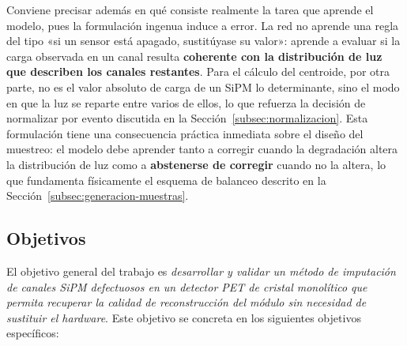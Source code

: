 Conviene precisar además en qué consiste realmente la tarea que aprende el modelo, pues la
formulación ingenua induce a error. La red no aprende una regla del tipo «si un sensor está apagado,
sustitúyase su valor»: aprende a evaluar si la carga observada en un canal resulta
\textbf{coherente con la distribución de luz que describen los canales restantes}. Para el cálculo
del centroide, por otra parte, no es el valor absoluto de carga de un SiPM lo determinante, sino el
modo en que la luz se reparte entre varios de ellos, lo que refuerza la decisión de normalizar por
evento discutida en la Sección~\ref{subsec:normalizacion}. Esta formulación tiene una consecuencia
práctica inmediata sobre el diseño del muestreo: el modelo debe aprender tanto a corregir cuando la
degradación altera la distribución de luz como a \textbf{abstenerse de corregir} cuando no la
altera, lo que fundamenta físicamente el esquema de balanceo descrito en la
Sección~\ref{subsec:generacion-muestras}.

\subsection{Objetivos}
\label{subsec:objetivos}

El objetivo general del trabajo es \emph{desarrollar y validar un método de imputación de canales
SiPM defectuosos en un detector PET de cristal monolítico que permita recuperar la calidad de
reconstrucción del módulo sin necesidad de sustituir el hardware}. Este objetivo se concreta en los
siguientes objetivos específicos:

